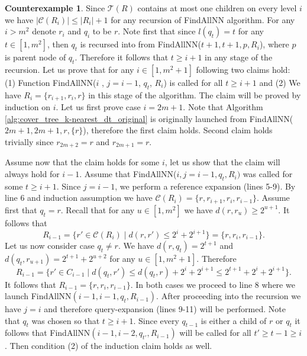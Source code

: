 \documentclass[a4paper,UKenglish,cleveref, autoref]{lipics-v2019}
\numberwithin{algocf}{section}
\theoremstyle{definition}
\theoremstyle{definition}
\theoremstyle{definition}
\newtheorem{cexa}[algocf]{Counterexample}
\theoremstyle{plain}
\newcommand{\C}{\mathcal{C}}
\newcommand{\T}{\mathcal{T}}
\begin{document}
\begin{cexa}
Since $\T(R)$ contains at most one children on every level $i$ we have $|\C(R_i)| \leq |R_i| + 1$ for any recursion of FindAllNN algorithm. For any $i > m^2$ denote $r_i$ and $q_i$ to be $r$.
 Note first that since $l(q_t) = t$ for any $t \in [1,m^2]$, then $q_t$ is recursed into from FindAllNN($t+1,t+1,p,R_i$), where $p$ is parent node of $q_t$. Therefore it follows that $t \geq i + 1 $ in any stage of the recursion. 
 Let us prove that for any $i \in [1,m^2+1]$ following two claims hold: (1) Function FindAllNN($i$ , $j = i-1$, $q_t$, $R_i$) is called for all $t \geq i + 1$ and (2) We have  $R_i = \{r_{i+1}, r_{i}, r\}$ in this stage of the algorithm. The claim will be proved by induction on $i$. Let us first prove case $i = 2m+1$.  Note that  Algorithm \ref{alg:cover_tree_k-nearest_dt_original} is originally launched from FindAllNN($2m+1,2m+1,r, \{r\}$), 
therefore the first claim holds. Second claim holds trivially since $r_{2m+2} = r$ and $r_{2m+1} = r$.
\medskip
 
 Assume now that the claim holds for some $i$, let us show that the claim will always hold for $i-1$. Assume that FindAllNN($i , j = i-1, q_{t}, R_i)$ was called for some $t \geq i+1$. Since $j = i-1$, we perform a reference expansion (lines 5-9). By line $6$ and induction assumption we have $\C(R_i) = \{r, r_{i+1}, r_{i}, r_{i-1}\}$. Assume first that $q_t = r$.
Recall that for any $u \in [1,m^2]$ we have $d(r,r_{u}) \geq 2^{u+1} $. It follows that
$$R_{i-1} = \{ r' \in \C(R_i) \mid d(r, r') \leq  2^{i} + 2^{i+1}\} = \{r,r_{i},r_{i-1}\}.$$
Let us now consider case $q_t \neq r$. We have $d(r,q_t) = 2^{t+1}$ and $d(q_t, r_{u+1}) = 2^{t+1} + 2^{u+2}$ for any $u \in [1,m^2+1]$. Therefore
$$R_{i-1} = \{ r' \in C_{i-1} \mid d(q_t, r') \leq d(q_t,r) + 2^i + 2^{i+1} \leq 2^{t+1} + 2^{i} + 2^{i+1}\}.$$
It follows that $R_{i-1} = \{r, r_{i}, r_{i-1}\}$. In both cases we proceed to line $8$ where we launch FindAllNN$(i-1 , i-1, q_{t}, R_{i-1})$. After proceeding into the recursion we have $j = i$ and therefore query-expansion (lines 9-11) will be performed.  Note that $q_{t}$ was chosen so that $t \geq i+1$. Since every $q_{t-1}$ is either a child of $r$ or $q_{t}$ it follows that FindAllNN$(i-1 , i-2, q_{t'}, R_{i-1})$ will be called for all $t' \geq t-1 \geq i$. Then condition (2) of the induction claim holds as well. 
\medskip


\end{cexa}
\end{document}
